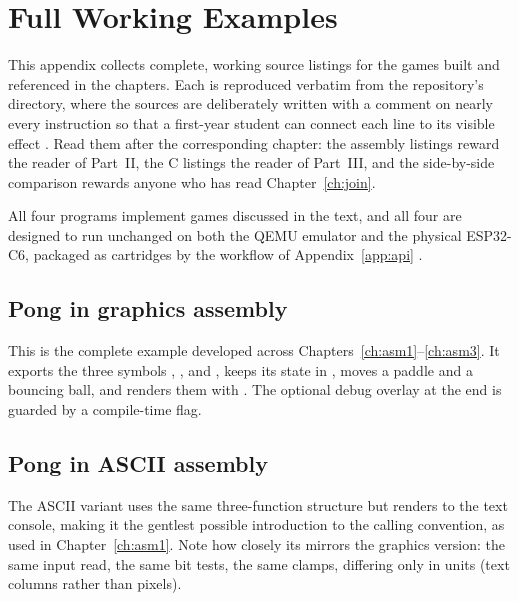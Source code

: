 \chapter{Full Working Examples}
\label{app:worked}

This appendix collects complete, working source listings for the games built and
referenced in the chapters. Each is reproduced verbatim from the \prg repository's
 directory, where the sources are deliberately written with a
comment on nearly every instruction so that a first-year student can connect each
line to its visible effect \citep{prg32repo}. Read them after the corresponding
chapter: the assembly listings reward the reader of Part~II, the C listings the
reader of Part~III, and the side-by-side comparison rewards anyone who has read
Chapter~\ref{ch:join}.

All four programs implement games discussed in the text, and all four are designed
to run unchanged on both the QEMU emulator and the physical ESP32\nobreakdash-C6, packaged as
 cartridges by the workflow of Appendix~\ref{app:api}
\citep{prg32qemu}.

\section{Pong in graphics assembly}

This is the complete  example developed across
Chapters~\ref{ch:asm1}--\ref{ch:asm3}. It exports the three symbols
, , and
, keeps its state in , moves a paddle and a
bouncing ball, and renders them with . The optional debug
overlay at the end is guarded by a compile-time flag.



\section{Pong in ASCII assembly}

The ASCII variant uses the same three-function structure but renders to the text
console, making it the gentlest possible introduction to the calling convention,
as used in Chapter~\ref{ch:asm1}. Note how closely its  mirrors the
graphics version: the same input read, the same bit tests, the same clamps,
differing only in units (text columns rather than pixels).

